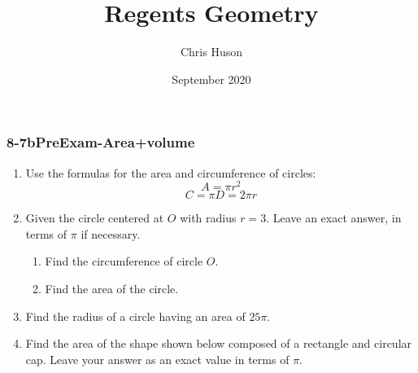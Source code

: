 \documentclass[12pt, twoside]{article}
\title{Regents Geometry}
\author{Chris Huson}
\date{September 2020}
\begin{document}
\subsubsection*{8-7bPreExam-Area+volume}
\begin{enumerate}
\item Use the formulas for the area and circumference of circles:
  \[A=\pi r^2\]
  \[C=\pi D = 2\pi r\]
  
\item Given the circle centered at $O$ with radius $r=3$. Leave an exact answer, in terms of $\pi$ if necessary.
  \begin{multicols}{2}
    \begin{enumerate}
      \item Find the circumference of circle $O$. %
      \item Find the area of the circle.\vspace{2cm}
    \end{enumerate}
  \end{multicols}

\item Find the radius of a circle having an area of $25 \pi$. \vspace{2cm}
  
\item Find the area of the shape shown below composed of a rectangle and circular cap. Leave your answer as an exact value in terms of $\pi$.
    \begin{flushright}
  \end{flushright}\vspace{1cm}


\end{enumerate}
\end{document}
